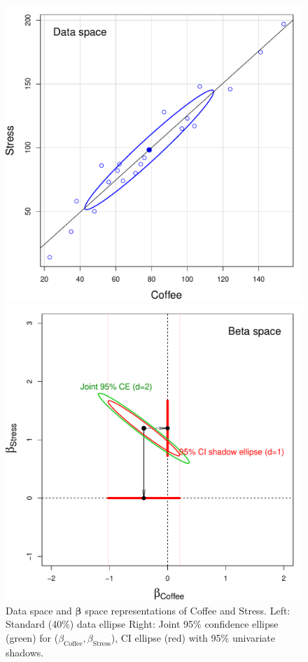 \documentclass[11pt]{article}%
\renewcommand*{\vec}[1]{\ensuremath{\bm{#1}}}
\begin{document}
\begin{figure}[htb]
  \begin{minipage}[c]{.485\textwidth}
   \includegraphics[width=1\linewidth,clip]{fig/vis-reg-coffee12a}
   \end{minipage}%
  \hfill
  \begin{minipage}[c]{.485\textwidth}
   \includegraphics[width=1\linewidth,clip]{fig/vis-reg-coffee12b}
  \end{minipage}
  \caption{Data space and $\vec{\beta}$ space representations of Coffee and Stress.
   Left: Standard (40\%) data ellipse Right: Joint 95\% confidence ellipse (green) for
   ($\beta_{\mathrm{Coffee}}, \beta_{\mathrm{Stress}}$), CI ellipse (red) with 95\% univariate shadows.
  }%
  \label{fig:vis-reg-coffee12}
\end{figure}
\end{document}

